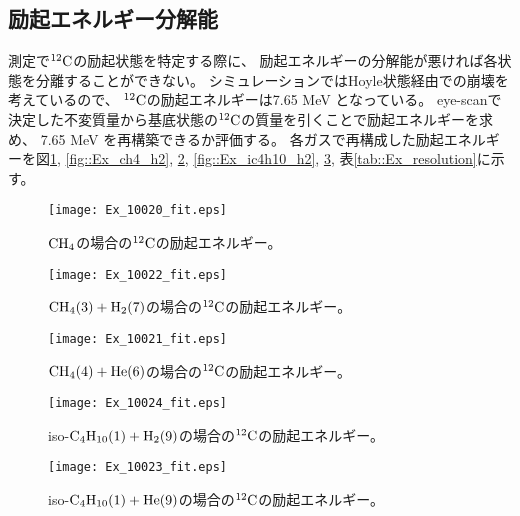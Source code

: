 \documentclass[../master]{subfiles}
\begin{document}
\subsection{励起エネルギー分解能}
測定で${}^{12}{\rm C}$の励起状態を特定する際に、
励起エネルギーの分解能が悪ければ各状態を分離することができない。
シミュレーションではHoyle状態経由での崩壊を考えているので、
${}^{12}{\rm C}$の励起エネルギーは7.65 MeV となっている。
eye-scanで決定した不変質量から基底状態の${}^{12}{\rm C}$の質量を引くことで励起エネルギーを求め、
7.65 MeV を再構築できるか評価する。
各ガスで再構成した励起エネルギーを図\ref{fig::Ex_ch4}, \ref{fig::Ex_ch4_h2}, \ref{fig::Ex_ch4_he},
\ref{fig::Ex_ic4h10_h2}, \ref{fig::Ex_ic4h10_he}, 表\ref{tab::Ex_resolution}に示す。
\begin{figure}
  \centering
  \begin{minipage}{0.45\columnwidth}
    \centering
    \texttt{[image: Ex\_10020\_fit.eps]}
    \caption{$\rm CH_{4}$の場合の${}^{12}{\rm C}$の励起エネルギー。}
    \label{fig::Ex_ch4}
  \end{minipage}
\end{figure}
\begin{figure}
  \centering
  \begin{minipage}{0.45\columnwidth}
    \centering
    \texttt{[image: Ex\_10022\_fit.eps]}
    \caption{$\rm CH_{4} (3) + H_{2} (7)$の場合の${}^{12}{\rm C}$の励起エネルギー。}
    \label{fig::Ex_ch4_h2}
  \end{minipage}
  \begin{minipage}{0.45\columnwidth}
    \centering
    \texttt{[image: Ex\_10021\_fit.eps]}
    \caption{$\rm CH_{4} (4) + He (6)$の場合の${}^{12}{\rm C}$の励起エネルギー。}
    \label{fig::Ex_ch4_he}
  \end{minipage}
\end{figure}
\begin{figure}
  \centering
  \begin{minipage}{0.45\columnwidth}
    \centering
    \texttt{[image: Ex\_10024\_fit.eps]}
    \caption{iso-$\rm C_{4}H_{10} (1) + H_{2} (9)$の場合の${}^{12}{\rm C}$の励起エネルギー。}
    \label{fig::Ex_ic4h10_h2}
  \end{minipage}
  \begin{minipage}{0.45\columnwidth}
    \centering
    \texttt{[image: Ex\_10023\_fit.eps]}
    \caption{iso-$\rm C_{4}H_{10} (1) + He (9)$の場合の${}^{12}{\rm C}$の励起エネルギー。}
    \label{fig::Ex_ic4h10_he}
  \end{minipage}
\end{figure}
\end{document}
